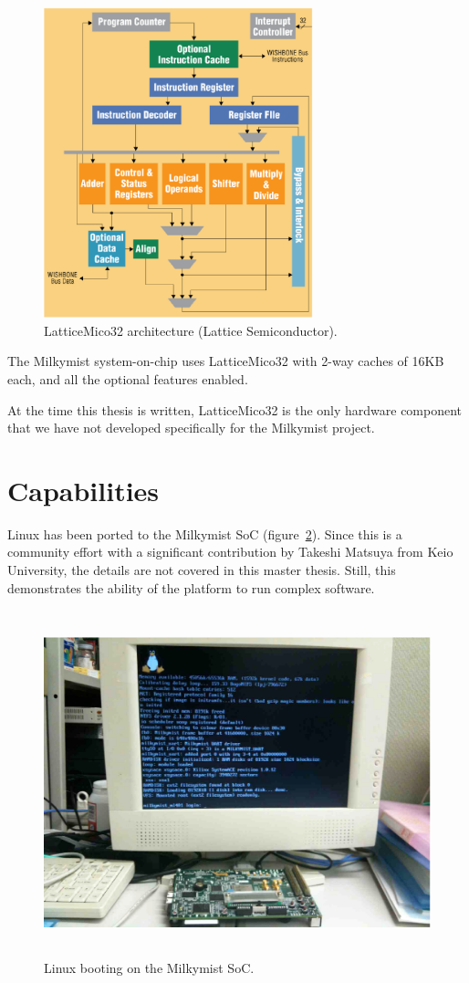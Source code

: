\documentclass[a4paper,11pt]{kthesis}
\begin{document}
\begin{figure}[htp]
\centering
\includegraphics[height=90mm]{lm32arch.eps}
\caption{LatticeMico32 architecture (Lattice Semiconductor).}
\label{fig:lm32arch}
\end{figure}

The Milkymist system-on-chip uses LatticeMico32 with 2-way caches of 16KB each, and all the optional features enabled.

At the time this thesis is written, LatticeMico32 is the only hardware component that we have not developed specifically for the Milkymist project.

\section{Capabilities}
Linux has been ported to the Milkymist SoC (figure~\ref{fig:linux}). Since this is a community effort with a significant contribution by Takeshi Matsuya from Keio University, the details are not covered in this master thesis. Still, this demonstrates the ability of the platform to run complex software.

\begin{figure}[htp]
\centering
\includegraphics[height=100mm]{linux.eps}
\caption{Linux booting on the Milkymist SoC.}
\label{fig:linux}
\end{figure}
\end{document}
